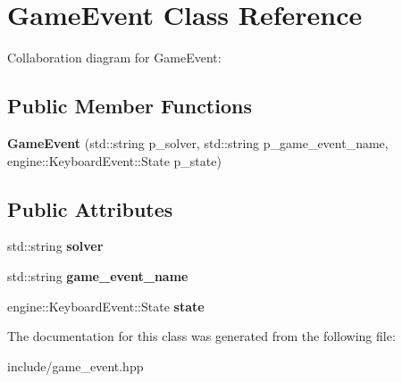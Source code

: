 \hypertarget{class_game_event}{}\section{Game\+Event Class Reference}
\label{class_game_event}


Collaboration diagram for Game\+Event\+:
\subsection*{Public Member Functions}
\begin{DoxyCompactItemize}
\item 
{\bfseries Game\+Event} (std\+::string p\+\_\+solver, std\+::string p\+\_\+game\+\_\+event\+\_\+name, engine\+::\+Keyboard\+Event\+::\+State p\+\_\+state)\hypertarget{class_game_event_a78d129d45a41645717dcc3128b873280}{}\label{class_game_event_a78d129d45a41645717dcc3128b873280}

\end{DoxyCompactItemize}
\subsection*{Public Attributes}
\begin{DoxyCompactItemize}
\item 
std\+::string {\bfseries solver}\hypertarget{class_game_event_ae7cc1acbf19673745aa7322ae5d09db2}{}\label{class_game_event_ae7cc1acbf19673745aa7322ae5d09db2}

\item 
std\+::string {\bfseries game\+\_\+event\+\_\+name}\hypertarget{class_game_event_a2a59611f44eeb8b4e83776ba1e76527e}{}\label{class_game_event_a2a59611f44eeb8b4e83776ba1e76527e}

\item 
engine\+::\+Keyboard\+Event\+::\+State {\bfseries state}\hypertarget{class_game_event_a119d82687094ee388efecd19f8f7043a}{}\label{class_game_event_a119d82687094ee388efecd19f8f7043a}

\end{DoxyCompactItemize}


The documentation for this class was generated from the following file\+:\begin{DoxyCompactItemize}
\item 
include/game\+\_\+event.\+hpp\end{DoxyCompactItemize}
